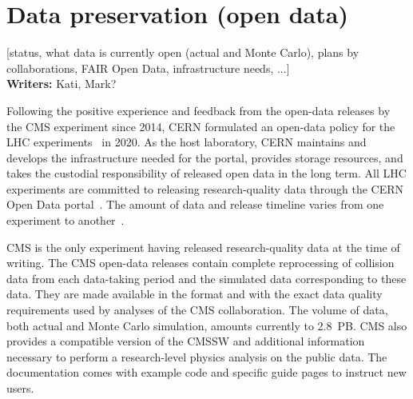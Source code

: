 \documentclass[11pt]{article}
\begin{document}
\section{Data preservation (open data)}
\label{data-preservation}

[status, what data is currently open (actual and Monte Carlo), plans by collaborations, FAIR Open Data, infrastructure needs, ...]\\

\noindent\textbf{Writers:} Kati, Mark?



Following the positive experience and feedback from the open-data releases by the CMS experiment since 2014, CERN formulated an open-data policy for the LHC experiments~\cite{cern-data-policy} in 2020. As the host laboratory, CERN maintains and develops the infrastructure needed for the portal, provides storage resources, and takes the custodial responsibility of released open data in the long term. All LHC experiments are committed to releasing research-quality data through the CERN Open Data portal~\cite{CODP}. The amount of data and release timeline varies from one experiment to another~\cite{cern-data-policy,cern-open-data-privacy-policy,cms-open-data-policy,atlas-open-data-policy,lhcb-open-data-policy,alice-open-data-policy}. 

CMS is the only experiment having released research-quality data at the time of writing. The CMS open-data releases contain complete reprocessing of collision data from each data-taking period and the simulated data corresponding to these data. They are made available in the format and with the exact data quality requirements used by analyses of the CMS collaboration. The volume of data, both actual and Monte Carlo simulation, amounts currently to 2.8~PB. CMS also provides a compatible version of the CMSSW and additional information necessary to perform a research-level physics analysis on the public data. The documentation comes with example code and specific guide pages to instruct new users.
\end{document}
